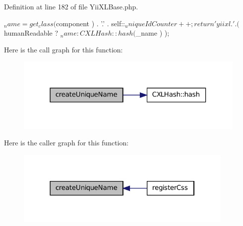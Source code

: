 Definition at line 182 of file YiiXLBase.php.




\begin{DoxyCode}
  {
    $_name = get_class( $component ) . '.' . self::$_uniqueIdCounter++;
    return 'yiixl.' . ( $humanReadable ? $_name : CXLHash::hash( $_name ) );
  }
\end{DoxyCode}




Here is the call graph for this function:\nopagebreak
\begin{figure}[H]
\begin{center}
\leavevmode
\includegraphics[width=316pt]{classYiiXLBase_a63e266f4aeea2000b20b5808038b8aa7_cgraph}
\end{center}
\end{figure}




Here is the caller graph for this function:\nopagebreak
\begin{figure}[H]
\begin{center}
\leavevmode
\includegraphics[width=298pt]{classYiiXLBase_a63e266f4aeea2000b20b5808038b8aa7_icgraph}
\end{center}
\end{figure}


